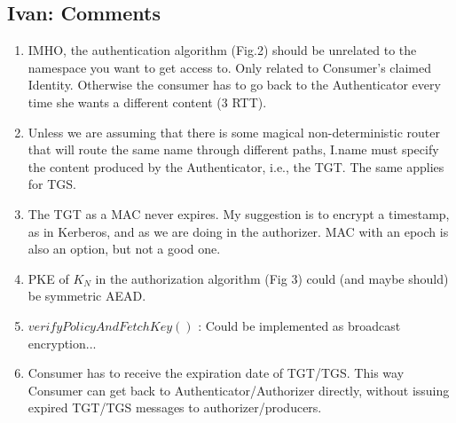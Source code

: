 \subsection{Ivan: Comments}
\begin{enumerate}
 \item IMHO, the authentication algorithm (Fig.2) should be unrelated to the namespace you want to get access to. Only related to Consumer's claimed Identity. Otherwise the consumer has to go back to the Authenticator every time she wants a different content (3 RTT).
 \item Unless we are assuming that there is some magical non-deterministic router that will route the same name through different paths, I.name must specify the content produced by the Authenticator, i.e., the TGT. The same applies for TGS.
 \item The TGT as a MAC never expires. My suggestion is to encrypt a timestamp, as in Kerberos, and as we are doing in the authorizer. MAC with an epoch is also an option, but not a good one.
 \item PKE of $K_N$ in the authorization algorithm (Fig 3) could (and maybe should) be symmetric AEAD.
 \item $verifyPolicyAndFetchKey()$ : Could be implemented as broadcast encryption...
 \item Consumer has to receive the expiration date of TGT/TGS. This way Consumer can get back to Authenticator/Authorizer directly, without issuing expired TGT/TGS messages to authorizer/producers.
\end{enumerate}